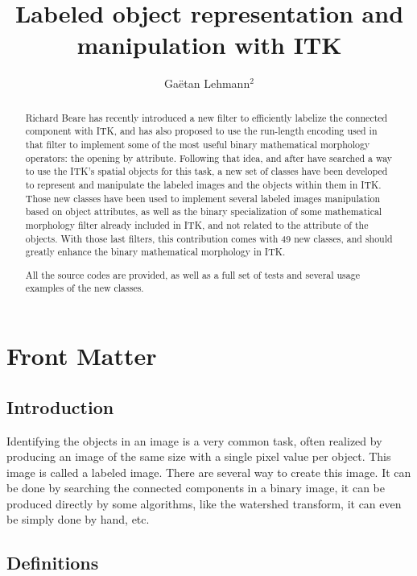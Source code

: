 \documentclass{InsightArticle}
\title{Labeled object representation and manipulation with ITK}
\author{Ga\"etan Lehmann{$^2$}}
\begin{document}
\maketitle

\ifhtml
\chapter*{Front Matter\label{front}}
\fi


\begin{abstract}
\noindent

Richard Beare has recently introduced a new filter to efficiently labelize the
connected component with ITK, and has also proposed to use the run-length
encoding used in that filter to implement some of the most useful binary
mathematical morphology operators: the opening by attribute.
Following that idea, and after have searched a way to use the ITK's spatial
objects for this task, a new set of classes have been developed to represent and
manipulate the labeled images and the objects within them in ITK.
Those new classes have been used to implement several labeled images
manipulation based on object attributes, as well as the binary specialization of
some mathematical morphology filter already included in ITK, and not related to
the attribute of the objects. With those last filters, this contribution comes
with 49 new classes, and should greatly enhance the binary mathematical
morphology in ITK.

All the source codes are provided, as well as a full set of tests and several
usage examples of the new classes.

\end{abstract}

\tableofcontents

\section{Introduction}

Identifying the objects in an image is a very common task, often realized by
producing an image of the same size with a single pixel value per object. This
image is called a labeled image. There are several way to create this image. It
can be done by searching the connected components in a binary image, it can be
produced directly by some algorithms, like the watershed transform, it can even
be simply done by hand, etc.

\section{Definitions}
\end{document}
